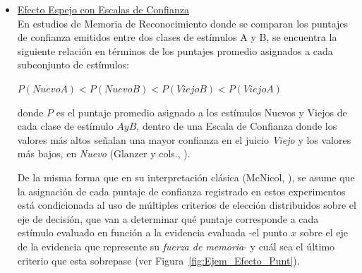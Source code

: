 \begin{itemize}
\item \underline{Efecto Espejo con Escalas de Confianza}\\

En estudios de Memoria de Reconocimiento donde se comparan los puntajes de confianza emitidos entre dos clases de estímulos A y B, se encuentra la siguiente relación en términos de los puntajes promedio asignados a cada  subconjunto de estímulos:\\

\begin{center}
$P(NuevoA) < P(NuevoB) < P(ViejoB) < P(ViejoA)$\\
\end{center}
\begin{center}
donde $P$ es el puntaje promedio asignado a los estímulos Nuevos y Viejos de cada clase de estímulo $A y B$, dentro de una Escala de Confianza donde los valores más altos señalan una mayor confianza en el juicio \textit{Viejo} y los valores más bajos, en \textit{Nuevo} (Glanzer y cols., \citeyear{Glanzer1993}).\\
\end{center}

De la misma forma que en su interpretación clásica (McNicol, \citeyear{McNicol2, McNicol5}), se asume que la asignación de cada puntaje de confianza registrado en estos experimentos está condicionada al uso de múltiples criterios de elección distribuidos sobre el eje de decisión, que van a determinar qué puntaje corresponde a cada estímulo evaluado en función a la evidencia evaluada -el punto $x$ sobre el eje de la evidencia que represente su \textit{fuerza de memoria}- y cuál sea el último criterio que esta sobrepase (ver Figura~\ref{fig:Ejem_Efecto_Punt}).\\


\end{itemize}
